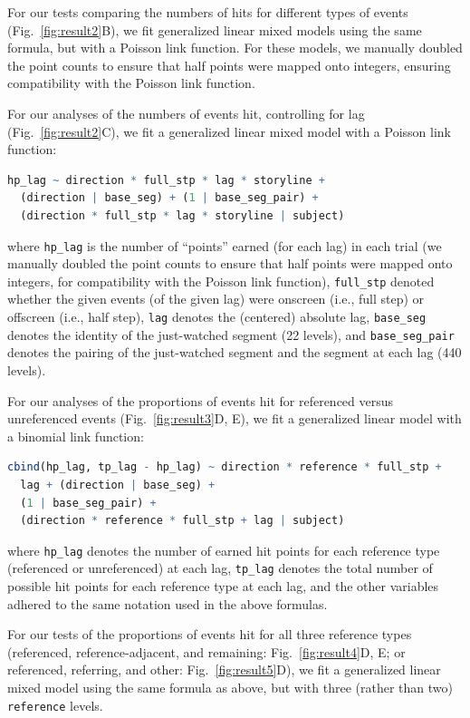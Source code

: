 \documentclass[10pt]{article}
\begin{document}
For our tests comparing the numbers of hits for different types of events (Fig.~\ref{fig:result2}B), we fit generalized linear mixed models using the same formula, but with a Poisson link function.  For these models, we manually doubled the point counts to ensure that half points were mapped onto integers, ensuring compatibility with the Poisson link function.

For our analyses of the numbers of events hit, controlling for lag (Fig.~\ref{fig:result2}C), we fit a generalized linear mixed model with a Poisson link function:
\begin{lstlisting}[language=R]
  hp_lag ~ direction * full_stp * lag * storyline +
  (direction | base_seg) + (1 | base_seg_pair) +
  (direction * full_stp * lag * storyline | subject)
  \end{lstlisting}
where \texttt{hp\_lag} is the number of ``points'' earned (for each lag) in each trial (we manually doubled the point counts to ensure that half points were mapped onto integers, for compatibility with the Poisson link function), \texttt{full\_stp} denoted whether the given events (of the given lag) were onscreen (i.e., full step) or offscreen (i.e., half step), \texttt{lag} denotes the (centered) absolute lag, \texttt{base\_seg} denotes the identity of the just-watched segment (22 levels), and \texttt{base\_seg\_pair} denotes the pairing of the just-watched segment and the segment at each lag (440 levels).

For our analyses of the proportions of events hit for referenced versus unreferenced events (Fig.~\ref{fig:result3}D, E), we fit a generalized linear model with a binomial link function:
\begin{lstlisting}[language=R]
  cbind(hp_lag, tp_lag - hp_lag) ~ direction * reference * full_stp +
  lag + (direction | base_seg) +
  (1 | base_seg_pair) +
  (direction * reference * full_stp + lag | subject)
\end{lstlisting}
where \texttt{hp\_lag} denotes the number of earned hit points for each reference type (referenced or unreferenced) at each lag, \texttt{tp\_lag} denotes the total number of possible hit points for each reference type at each lag, and the other variables adhered to the same notation used in the above formulas.

For our tests of the proportions of events hit for all three reference types (referenced, reference-adjacent, and remaining: Fig.~\ref{fig:result4}D, E; or referenced, referring, and other: Fig.~\ref{fig:result5}D), we fit a generalized linear mixed model using the same formula as above, but with three (rather than two) \texttt{reference} levels.
\end{document}
